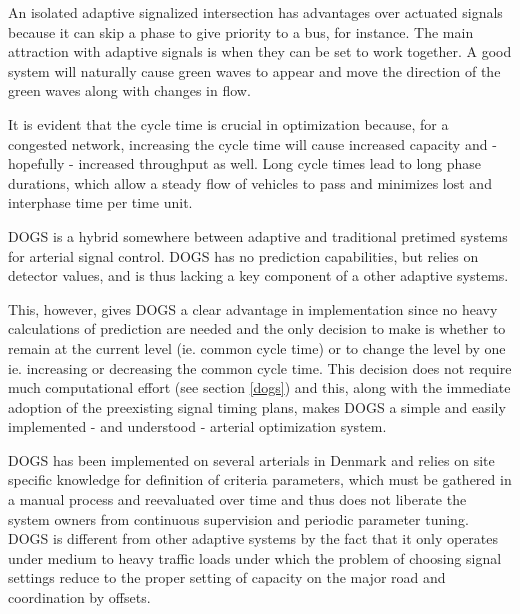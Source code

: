 An isolated adaptive signalized intersection has advantages over actuated signals because it can skip a phase to give priority to a bus, for instance. The main attraction with adaptive signals is when they can be set to work together. A good system will naturally cause green waves to appear and move the direction of the green waves along with changes in flow.

It is evident that the cycle time is crucial in optimization because, for a congested network, increasing the cycle time will cause increased capacity and - hopefully - increased throughput as well. Long cycle times lead to long phase durations, which allow a steady flow of vehicles to pass and minimizes lost and interphase time per time unit.

DOGS is a hybrid somewhere between adaptive and traditional pretimed systems for arterial signal control. DOGS has no prediction capabilities, but relies on detector values, and is thus lacking a key component of a other adaptive systems. 

This, however, gives DOGS a clear advantage in implementation since no heavy calculations of prediction are needed and the only decision to make is whether to remain at the current level (ie. common cycle time) or to change the level by one ie. increasing or decreasing the common cycle time. This decision does not require much computational effort (see section \ref{dogs}) and this, along with the immediate adoption of the preexisting signal timing plans, makes DOGS a simple and easily implemented - and understood - arterial optimization system.

DOGS has been implemented on several arterials in Denmark and relies on site specific knowledge for definition of criteria parameters, which must be gathered in a manual process and reevaluated over time and thus does not liberate the system owners from continuous supervision and periodic parameter tuning.
DOGS is different from other adaptive systems by the fact that it only operates under medium to heavy traffic loads under which the problem of choosing signal settings reduce to the proper setting of capacity on the major road and coordination by offsets.